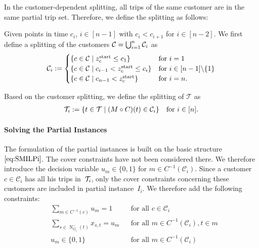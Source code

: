 In the customer-dependent splitting, all trips of the same customer are in the same partial trip set. Therefore, we define the splitting as follows:

\begin{definition}
\label{def:customer_dependent_splitting}

Given points in time $c_i$, $i\in[n-1]$ with $c_i<c_{i+1}$ for $i\in[n-2]$. We first define a splitting of the customers $\mathcal{C}=\bigcup_{i=1}^n\mathcal{C}_i$ as
\begin{align*}
	\mathcal{C}_i := \begin{cases}
		\left\{c\in\mathcal{C}\mid z^{\operatorname{start}}_c\leq c_1\right\} & \text{for } i=1 \\
		\left\{c\in\mathcal{C}\mid c_{i-1}<z^{\operatorname{start}}_c\leq c_i\right\} & \text{for } i\in[n-1]\backslash\{1\} \\
		\left\{c\in\mathcal{C}\mid c_{n-1}<z^{\operatorname{start}}_c\right\} & \text{for } i=n.
	\end{cases}
\end{align*}

Based on the customer splitting, we define the splitting of $\mathcal{T}$ as
\begin{align*}
	\mathcal{T}_i := \left\{t\in\mathcal{T}\mid (M\circ C)(t)\in\mathcal{C}_i\right\} && \text{for } i\in[n].
\end{align*}

\end{definition}

\paragraph{Solving the Partial Instances} \parfill

The formulation of the partial instances is built on the basic structure $\eqref{eq:SMILPi}$. The cover constraints have not been considered there. We therefore introduce the decision variable $u_m\in\{0,1\}$ for $m\in C^{-1}\left(\mathcal{C}_i\right)$. Since a customer $c\in\mathcal{C}_i$ has all his trips in~$\mathcal{T}_i$, only the cover constraints concerning these customers are included in partial instance~$I_i$. We therefore add the following constraints:
\begin{align}
	& \sum_{m\in C^{-1}(c)} u_m = 1 && \text{for all } c\in\mathcal{C}_i \label{eq:CMILP:customer} \\
	& \sum_{s\in\operatorname{N}_{\overline{G}_i}^-(t)} x_{s,t} = u_m && \text{for all } m\in C^{-1}\left(\mathcal{C}_i\right), t\in m \label{eq:CMILP:route} \\
	& u_m\in\{0,1\} && \text{for all } m\in C^{-1}\left(\mathcal{C}_i\right) \label{eq:CMILP:um}
\end{align}

